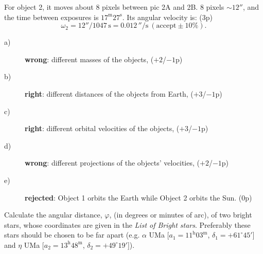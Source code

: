 \begin{enumerate}
For object 2, it moves about 8 pixels between pic 2A and 2B. 8 pixels
$\sim 12''$, and the time between exposures is $17^{\mathrm{m}}27^{\mathrm{s}}$.
Its angular velocity is: \hfill(3p)
\[ \omega_2 = 12''/1047\,\mathrm{s} = 0.012\,''/\mathrm{s}\ (\text{accept} \pm 10\%). \]
\begin{description}
\item[a)] \textbf{wrong}: different masses of the objects, \hfill($+2$/$-1$p)
\item[b)] \textbf{right}: different distances of the objects from Earth,
  \hfill($+3$/$-1$p)
\item[c)] \textbf{right}: different orbital velocities of the objects,
  \hfill($+3$/$-1$p)
\item[d)] \textbf{wrong}: different projections of the objects' velocities,
  \hfill($+2$/$-1$p)
\item[e)] \textbf{rejected}: Object 1 orbits the Earth while Object 2 orbits
  the Sun. \hfill(0p)
\end{description}
\end{enumerate}

Calculate the angular distance, $\varphi$, (in degrees or minutes of arc),
of two bright stars, whose coordinates are given in the \emph{List of Bright
stars}. Preferably these stars should be chosen to be far apart (e.g.
$\alpha$ UMa [$a_1 = 11^{\mathrm{h}}03^{\mathrm{m}}$,
$\delta_1 = +61^\circ 45'$] and $\eta$ UMa
[$a_2 = 13^{\mathrm{h}}48^{\mathrm{m}}$, $\delta_2 = +49^\circ 19'$]).


